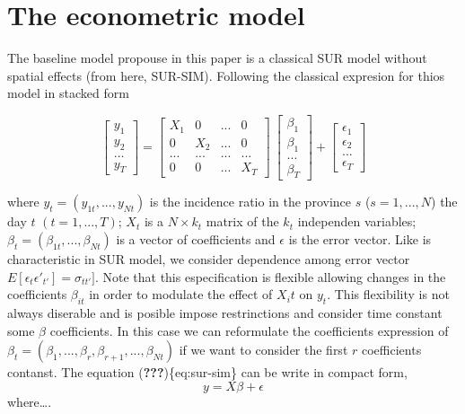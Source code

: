 \documentclass[]{elsarticle} %
\begin{document}
\hypertarget{the-econometric-model}{%
\section{The econometric model}\label{the-econometric-model}}

The baseline model propouse in this paper is a classical SUR model
without spatial effects (from here, SUR-SIM). Following the classical
expresion for thios model in stacked form

\begin{equation}
\begin{bmatrix}
y_1 \\ y_2 \\ ... \\ y_T
\end{bmatrix}
=
\begin{bmatrix}
X_1 & 0 & ... & 0 \\ 0 & X_2 & ... & 0 \\ ... & ... & ... & ... \\ 0 & 0 & ... & X_T
\end{bmatrix}
\
\begin{bmatrix}
\beta_1 \\ \beta_1 \\ ... \\ \beta_T
\end{bmatrix}
+
\begin{bmatrix}
\epsilon_1 \\ \epsilon_2 \\ ... \\ \epsilon_T
\end{bmatrix}
\label{eq:sur-sim}
\end{equation}

where \(y_{t}=(y_{1t},...,y_{Nt})\) is the incidence ratio in the
province \(s\) (\(s=1,...,N\)) the day \(t\) \((t=1,...,T)\); \(X_t\) is
a \(N \times k_t\) matrix of the \(k_t\) independen variables;
\(\beta_t=(\beta_{1t},...,\beta_{Nt})\) is a vector of coefficients and
\(\epsilon\) is the error vector. Like is characteristic in SUR model,
we consider dependence among error vector
\(E[\epsilon_t \epsilon'_{t'}]=\sigma_{tt'}]\). Note that this
especification is flexible allowing changes in the coefficients
\(\beta_{it}\) in order to modulate the effect of \(X_it\) on \(y_t\).
This flexibility is not always diserable and is posible impose
restrinctions and consider time constant some \(\beta\) coefficients. In
this case we can reformulate the coefficients expression of
\(\beta_t=(\beta_{1},...,\beta_{r},\beta_{r+1},...,\beta_{Nt})\) if we
want to consider the first \(r\) coefficients contanst. The equation
({\textbf{???}})\{eq:sur-sim\} can be write in compact form,
\begin{equation}
y = X \beta + \epsilon
\end{equation} where\ldots{}.
\end{document}
